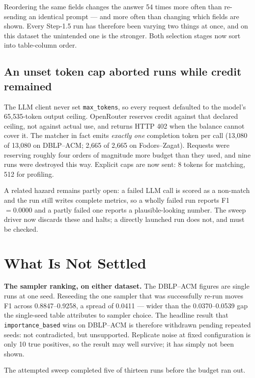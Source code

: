 \documentclass[11pt]{article}
\begin{document}
Reordering the same fields changes the answer 54 times more often than re-sending an
identical prompt --- and more often than changing which fields are shown. Every
Step-1.5 run has therefore been varying two things at once, and on this dataset the
unintended one is the stronger. Both selection stages now sort into table-column
order.

\subsection{An unset token cap aborted runs while credit remained}

The LLM client never set \texttt{max\_tokens}, so every request defaulted to the
model's 65{,}535-token output ceiling. OpenRouter reserves credit against that
declared ceiling, not against actual use, and returns HTTP 402 when the balance cannot
cover it. The matcher in fact emits \emph{exactly one} completion token per call
(13{,}080 of 13{,}080 on DBLP--ACM; 2{,}665 of 2{,}665 on Fodors--Zagat). Requests were
reserving roughly four orders of magnitude more budget than they used, and nine runs
were destroyed this way. Explicit caps are now sent: 8 tokens for matching, 512 for
profiling.

A related hazard remains partly open: a failed LLM call is scored as a non-match and
the run still writes complete metrics, so a wholly failed run reports F1 $=0.0000$ and
a partly failed one reports a plausible-looking number. The sweep driver now discards
these and halts; a directly launched run does not, and must be checked.

\section{What Is Not Settled}
\label{sec:notsettled}

\textbf{The sampler ranking, on either dataset.} The DBLP--ACM figures are single runs
at one seed. Reseeding the one sampler that was successfully re-run moves F1 across
0.8847--0.9258, a spread of 0.0411 --- wider than the 0.0370--0.0539 gap the
single-seed table attributes to sampler choice. The headline result that
\texttt{importance\_based} wins on DBLP--ACM is therefore withdrawn pending repeated
seeds: not contradicted, but unsupported. Replicate noise at fixed configuration is
only 10 true positives, so the result may well survive; it has simply not been shown.

The attempted sweep completed five of thirteen runs before the budget ran out.
\end{document}
